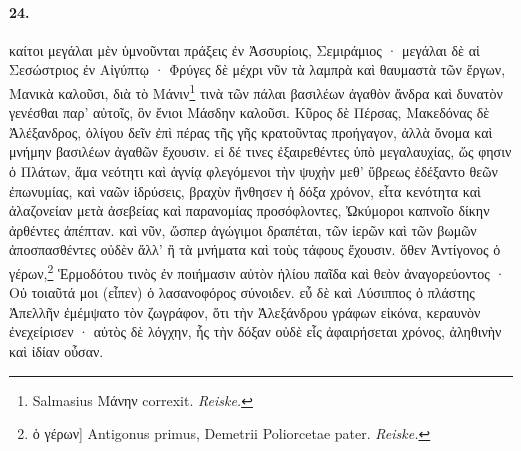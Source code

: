 \documentclass[a4paper, 11pt, oneside, polutonikogreek, german]{article}
\begin{document}
\paragraph{24.}
καίτοι μεγάλαι μὲν ὑμνοῦνται πράξεις ἐν Ἀσσυρίοις, Σεμιράμιος · μεγάλαι δὲ αἱ Σεσώστριος ἐν Αἰγύπτῳ · Φρύγες δὲ μέχρι νῦν τὰ λαμπρὰ καὶ θαυμαστὰ τῶν ἔργων, Μανικὰ καλοῦσι, διὰ τὸ Μάνιν\footnote{Salmasius Μάνην correxit. \emph{Reiske.}} τινὰ τῶν πάλαι βασιλέων ἀγαθὸν ἄνδρα καὶ δυνατὸν γενέσθαι παρ' αὐτοῖς, ὃν ἔνιοι Μάσδην καλοῦσι. Κῦρος δὲ Πέρσας, Μακεδόνας δὲ Ἀλέξανδρος, ὀλίγου δεῖν ἐπὶ πέρας τῆς γῆς κρατοῦντας προήγαγον, ἀλλὰ ὄνομα καὶ μνήμην βασιλέων ἀγαθῶν ἔχουσιν. εἰ δέ τινες ἐξαιρεθέντες ὑπὸ μεγαλαυχίας, ὥς φησιν ὁ Πλάτων, ἅμα νεότητι καὶ ἁγνίᾳ φλεγόμενοι τὴν ψυχὴν μεθ' ὕβρεως ἐδέξαντο θεῶν ἐπωνυμίας, καὶ ναῶν ἱδρύσεις, βραχὺν ἤνθησεν ἡ δόξα χρόνον, εἶτα κενότητα καὶ ἀλαζονείαν μετὰ ἀσεβείας καὶ παρανομίας προσόφλοντες, Ὠκύμοροι καπνοῖο δίκην ἀρθέντες ἀπέπταν. καὶ νῦν, ὥσπερ ἀγώγιμοι δραπέται, τῶν ἱερῶν καὶ τῶν βωμῶν ἀποσπασθέντες οὐδὲν ἄλλ' ἢ τὰ μνήματα καὶ τοὺς τάφους ἔχουσιν. ὅθεν Ἀντίγονος ὁ γέρων,\footnote{ὁ γέρων] Antigonus primus, Demetrii Poliorcetae pater. \emph{Reiske.}} Ἑρμοδότου τινὸς ἐν ποιήμασιν αὐτὸν ἡλίου παῖδα καὶ θεὸν ἀναγορεύοντος · Οὐ τοιαῦτά μοι (εἶπεν) ὁ λασανοφόρος σύνοιδεν. εὖ δὲ καὶ Λύσιππος ὁ πλάστης Ἀπελλῆν ἐμέμψατο τὸν ζωγράφον, ὅτι τὴν Ἀλεξάνδρου γράφων εἰκόνα, κεραυνὸν ἐνεχείρισεν · αὐτὸς δὲ λόγχην, ἧς τὴν δόξαν οὐδὲ εἷς ἀφαιρήσεται χρόνος, ἀληθινὴν καὶ ἰδίαν οὖσαν.
\end{document}
